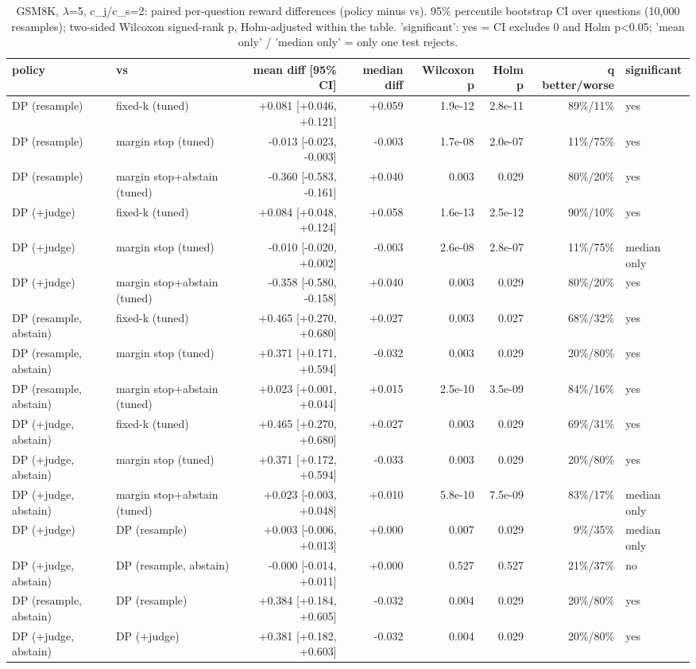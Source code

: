 \begin{table}[t]
\centering
\small
\caption{GSM8K, $\lambda$=5, c\_j/c\_s=2: paired per-question reward differences (policy minus vs). 95\% percentile bootstrap CI over questions (10,000 resamples); two-sided Wilcoxon signed-rank p, Holm-adjusted within the table. 'significant': yes = CI excludes 0 and Holm p<0.05; 'mean only' / 'median only' = only one test rejects.}
\label{tab:significance_gsm8k_lam5}
\begin{tabular}{llrrrrrl}
\toprule
policy & vs & mean diff [95\% CI] & median diff & Wilcoxon p & Holm p & q better/worse & significant \\
\midrule
DP (resample) & fixed-k (tuned) & +0.081 [+0.046, +0.121] & +0.059 & 1.9e-12 & 2.8e-11 & 89\%/11\% & yes \\
DP (resample) & margin stop (tuned) & -0.013 [-0.023, -0.003] & -0.003 & 1.7e-08 & 2.0e-07 & 11\%/75\% & yes \\
DP (resample) & margin stop+abstain (tuned) & -0.360 [-0.583, -0.161] & +0.040 & 0.003 & 0.029 & 80\%/20\% & yes \\
DP (+judge) & fixed-k (tuned) & +0.084 [+0.048, +0.124] & +0.058 & 1.6e-13 & 2.5e-12 & 90\%/10\% & yes \\
DP (+judge) & margin stop (tuned) & -0.010 [-0.020, +0.002] & -0.003 & 2.6e-08 & 2.8e-07 & 11\%/75\% & median only \\
DP (+judge) & margin stop+abstain (tuned) & -0.358 [-0.580, -0.158] & +0.040 & 0.003 & 0.029 & 80\%/20\% & yes \\
DP (resample, abstain) & fixed-k (tuned) & +0.465 [+0.270, +0.680] & +0.027 & 0.003 & 0.027 & 68\%/32\% & yes \\
DP (resample, abstain) & margin stop (tuned) & +0.371 [+0.171, +0.594] & -0.032 & 0.003 & 0.029 & 20\%/80\% & yes \\
DP (resample, abstain) & margin stop+abstain (tuned) & +0.023 [+0.001, +0.044] & +0.015 & 2.5e-10 & 3.5e-09 & 84\%/16\% & yes \\
DP (+judge, abstain) & fixed-k (tuned) & +0.465 [+0.270, +0.680] & +0.027 & 0.003 & 0.029 & 69\%/31\% & yes \\
DP (+judge, abstain) & margin stop (tuned) & +0.371 [+0.172, +0.594] & -0.033 & 0.003 & 0.029 & 20\%/80\% & yes \\
DP (+judge, abstain) & margin stop+abstain (tuned) & +0.023 [-0.003, +0.048] & +0.010 & 5.8e-10 & 7.5e-09 & 83\%/17\% & median only \\
DP (+judge) & DP (resample) & +0.003 [-0.006, +0.013] & +0.000 & 0.007 & 0.029 & 9\%/35\% & median only \\
DP (+judge, abstain) & DP (resample, abstain) & -0.000 [-0.014, +0.011] & +0.000 & 0.527 & 0.527 & 21\%/37\% & no \\
DP (resample, abstain) & DP (resample) & +0.384 [+0.184, +0.605] & -0.032 & 0.004 & 0.029 & 20\%/80\% & yes \\
DP (+judge, abstain) & DP (+judge) & +0.381 [+0.182, +0.603] & -0.032 & 0.004 & 0.029 & 20\%/80\% & yes \\
\bottomrule
\end{tabular}
\end{table}
